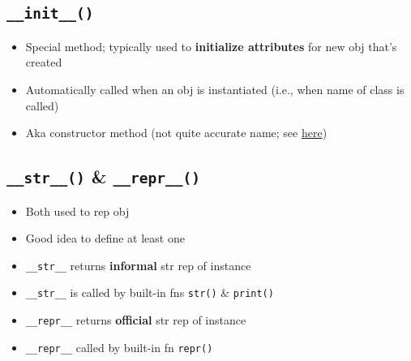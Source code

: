 \documentclass{article}
\begin{document}
\subsection{\texttt{\_\_init\_\_()}}
    \begin{multicols}{2}
        \begin{itemize}
            \item Special method; typically used to \textbf{initialize attributes} for new obj that's created
            \item Automatically called when an obj is instantiated (i.e., when name of class is called)
            \item Aka constructor method (not quite accurate name; see \href{https:://www.programiz.com/article/python-self-why}{here})
        \end{itemize}
    \end{multicols}

\subsection{\texttt{\_\_str\_\_()} \& \texttt{\_\_repr\_\_()}}
    \begin{multicols}{2}
        \begin{itemize}
            \item Both used to rep obj
            \item Good idea to define at least one
            \item \texttt{\_\_str\_\_} returns \textbf{informal} str rep of instance
            \item \texttt{\_\_str\_\_} is called by built-in fns \texttt{str()} \& \texttt{print()}
            \item \texttt{\_\_repr\_\_} returns \textbf{official} str rep of instance
            \item \texttt{\_\_repr\_\_} called by built-in fn \texttt{repr()}
        \end{itemize}
    \end{multicols}

\end{document}
